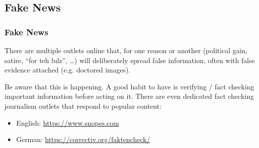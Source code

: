 \documentclass[aspectratio=169,dvipsnames]{beamer}
\begin{document}
\subsection{Fake News}

\begin{frame}
\frametitle{Fake News}

There are multiple outlets online that, for one reason or another (political gain, satire, ``for teh lulz'', \dots) will deliberately spread false information, often with false evidence attached (e.g. doctored images).
\pause\bigskip

Be aware that this is happening. A good habit to have is verifying / fact checking important information before acting on it. There are even dedicated fact checking journalism outlets that respond to popular content:
\medskip
\begin{itemize}
\item English: \url{https://www.snopes.com}
\item German: \url{https://correctiv.org/faktencheck/}
\end{itemize}

\end{frame}

\end{document}
